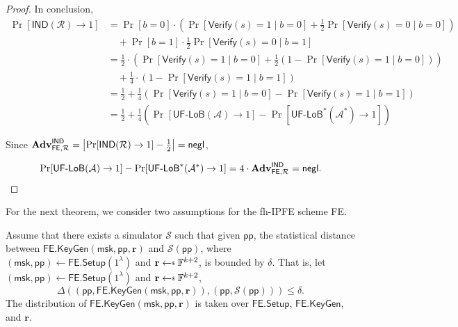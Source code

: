 \begin{proof}
In conclusion,
\begin{align*}
	\Pr[\textsf{IND}(\mathcal{R}) \to 1]
	&= \Pr[b = 0] \cdot \left( \Pr[\textsf{Verify}(s) = 1 \mid b = 0] + \frac{1}{2} \Pr[\textsf{Verify}(s) = 0 \mid b = 0] \right)  \\
	&\quad + \Pr[b = 1] \cdot \frac{1}{2} \Pr[\textsf{Verify}(s) = 0 \mid b = 1] \\
	&= \frac{1}{2} \cdot \left ( \Pr[\textsf{Verify}(s) = 1 \mid b = 0] + \frac{1}{2} (1 - \Pr[\textsf{Verify}(s) = 1 \mid b = 0]) \right) \\
	& \quad +  \frac{1}{4} \cdot (1 - \Pr[\textsf{Verify}(s) = 1 \mid b = 1]) \\
	&= \frac{1}{2} + \frac{1}{4} \left( \Pr[\textsf{Verify}(s) = 1 \mid b = 0] - \Pr[\textsf{Verify}(s) = 1 \mid b = 1] \right) \\
	&= \frac{1}{2} + \frac{1}{4} \left( \Pr[\textsf{UF-LoB}(\mathcal{A}) \to 1] - \Pr[ \textsf{UF-LoB}^*(\mathcal{A}^*) \to 1 ] \right)
\end{align*}

\noindent Since $\mathbf{Adv}_{\textsf{FE}, \mathcal{R}}^\textsf{IND} = \left| \Pr[\textsf{IND}(\mathcal{R}) \to 1 ] - \frac{1}{2} \right| = \mathsf{negl}$,

\[
	\Pr[\textsf{UF-LoB}(\mathcal{A}) \to 1] - \Pr[ \textsf{UF-LoB}^*(\mathcal{A}^*) \to 1 ] = 4 \cdot \mathbf{Adv}_{\textsf{FE}, \mathcal{R}}^\textsf{IND} = \mathsf{negl}.
\]

\end{proof}

For the next theorem, we consider two assumptions for the fh-IPFE scheme \textsf{FE}.

\begin{assumption}
\label{assump:ind-uf-lob:simulator}
	Assume that there exists a simulator $\mathcal{S}$ such that given $\textsf{pp}$, the statistical distance between $\textsf{FE.KeyGen}(\textsf{msk}, \textsf{pp}, \mathbf{r})$ and $\mathcal{S}(\textsf{pp})$, where $(\textsf{msk}, \textsf{pp}) \gets \textsf{FE.Setup}(1^\lambda)$ and $\mathbf{r} \getsdollar \mathbb{F}^{k+2}$, is bounded by $\delta$.
	That is, let $(\textsf{msk}, \textsf{pp}) \gets \textsf{FE.Setup}(1^\lambda)$ and $\mathbf{r} \getsdollar \mathbb{F}^{k+2}$,
	\[
		\Delta \left( (\textsf{pp}, \textsf{FE.KeyGen}(\textsf{msk}, \textsf{pp}, \mathbf{r})), (\textsf{pp}, \mathcal{S}(\textsf{pp}) ) \right) \leq \delta.
	\]
	The distribution of $\textsf{FE.KeyGen}(\textsf{msk}, \textsf{pp}, \mathbf{r})$ is taken over $\textsf{FE.Setup}$, $\textsf{FE.KeyGen}$, and $\mathbf{r}$.

\end{assumption}


